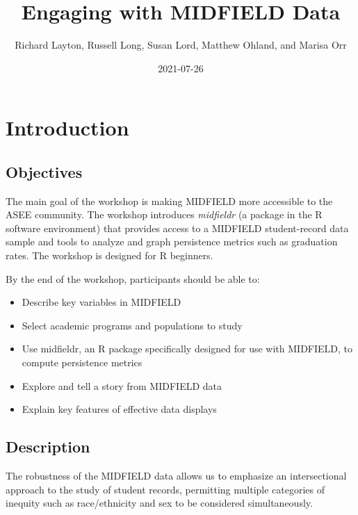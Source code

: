 \documentclass[
]{book}
\title{Engaging with MIDFIELD Data}
\author{Richard Layton, Russell Long, Susan Lord, Matthew Ohland, and Marisa Orr}
\date{2021-07-26}
\providecommand{\tightlist}{%
  \setlength{\itemsep}{0pt}\setlength{\parskip}{0pt}}
\begin{document}
\maketitle

{
\setcounter{tocdepth}{1}
\tableofcontents
}
\hypertarget{introduction}{%
\chapter{Introduction}\label{introduction}}

\hypertarget{objectives}{%
\section*{Objectives}\label{objectives}}

The main goal of the workshop is making MIDFIELD more accessible to the ASEE community. The workshop introduces \emph{midfieldr} (a package in the R software environment) that provides access to a MIDFIELD student-record data sample and tools to analyze and graph persistence metrics such as graduation rates. The workshop is designed for R beginners.

By the end of the workshop, participants should be able to:

\begin{itemize}
\tightlist
\item
  Describe key variables in MIDFIELD
\item
  Select academic programs and populations to study
\item
  Use midfieldr, an R package specifically designed for use with MIDFIELD, to compute persistence metrics
\item
  Explore and tell a story from MIDFIELD data
\item
  Explain key features of effective data displays
\end{itemize}

\hypertarget{description}{%
\section*{Description}\label{description}}

The robustness of the MIDFIELD data allows us to emphasize an intersectional approach to the study of student records, permitting multiple categories of inequity such as race/ethnicity and sex to be considered simultaneously.
\end{document}
